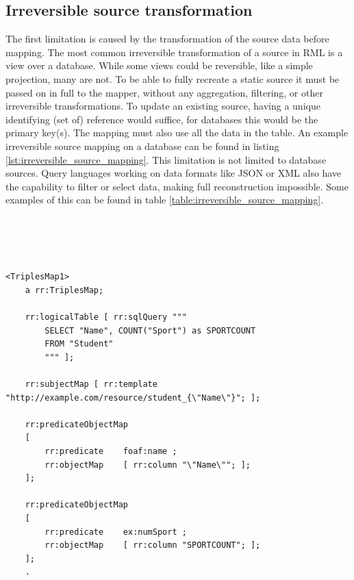\subsection{Irreversible source transformation}
\label{subsection:irreversible_source_transformation}
The first limitation is caused by the transformation of the source data before mapping. The most common irreversible transformation of a source in RML is a view over a database. While some views could be reversible, like a simple projection, many are not. To be able to fully recreate a static source it must be passed on in full to the mapper, without any aggregation, filtering, or other irreversible transformations. To update an existing source, having a unique identifying (set of) reference would suffice, for databases this would be the primary key(s). The mapping must also use all the data in the table. An example irreversible source mapping on a database can be found in listing \ref{lst:irreversible_source_mapping}. This limitation is not limited to database sources. Query languages working on data formats like JSON or XML also have the capability to filter or select data, making full reconstruction impossible. Some examples of this can be found in table \ref{table:irreversible_source_mapping}.

\begin{lstlisting}[caption={Irreversible source mapping from R2RML Test cases}, label={lst:irreversible_source_mapping}, captionpos=b, basicstyle=\small]




<TriplesMap1>
    a rr:TriplesMap;
        
    rr:logicalTable [ rr:sqlQuery """
        SELECT "Name", COUNT("Sport") as SPORTCOUNT
        FROM "Student"
        """ ];

    rr:subjectMap [ rr:template "http://example.com/resource/student_{\"Name\"}"; ]; 

    rr:predicateObjectMap
    [ 
        rr:predicate	foaf:name ; 
        rr:objectMap	[ rr:column "\"Name\""; ];
    ];

    rr:predicateObjectMap
    [ 
		rr:predicate	ex:numSport ; 
		rr:objectMap	[ rr:column "SPORTCOUNT"; ];
    ];
    .
\end{lstlisting}

